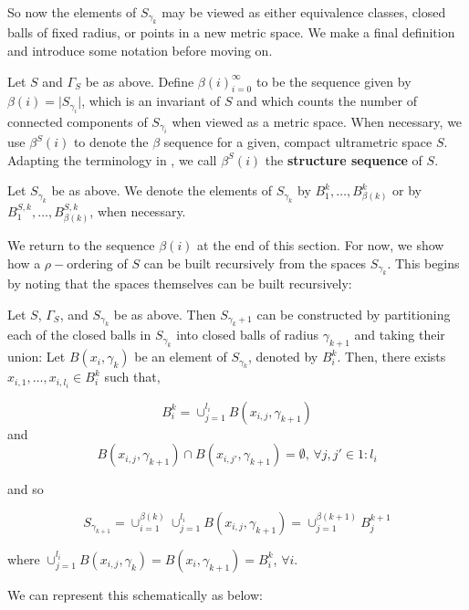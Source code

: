 So now the elements of $S_{\gamma_k}$ may be viewed as either equivalence classes, closed balls of fixed radius, or points in a new metric space. We  make a final definition and introduce some notation before moving on.

\begin{definition*}
Let $S$ and $\Gamma_S$ be as above. Define $\beta(i)_{i=0}^{\infty}$ to be the sequence given by $\beta(i) = \lvert  S_{\gamma_i}\rvert$, which is an invariant of $S$ and which counts the number of connected components of $S_{\gamma_i}$ when viewed as a metric space. When necessary, we use $\beta^S(i)$ to denote the $\beta$ sequence for a given, compact  ultrametric space $S$. Adapting the terminology in \cite{fp}, we call $\beta^S(i)$ the \textbf{structure sequence} of $S$.
\end{definition*}

\begin{notation*}
Let $S_{\gamma_k}$ be as above. We denote the elements of $S_{\gamma_k}$ by $B^k_1, \ldots, B^k_{\beta(k)}$ or by $B^{S,k}_1, \ldots, B^{S,k}_{\beta(k)}$, when necessary.
\end{notation*}


We return to the sequence $\beta(i)$ at the end of this section. For now, we show how a $\rho-$ordering of $S$ can be built recursively from the spaces $S_{\gamma_k}$. This begins by noting that the spaces themselves can be built recursively:

\begin{observation*}
Let $S$, $\Gamma_S$, and $S_{\gamma_k}$ be as above. Then $S_{\gamma_k+1}$ can be constructed by partitioning each of the closed balls in $S_{\gamma_k}$ into closed balls of radius $\gamma_{k+1}$ and taking their union:  Let $B(x_i, \gamma_k)$  be an element of $S_{\gamma_k}$, denoted by  $B^k_i$. Then, there exists $x_{i,1},\ldots, x_{i,l_{i}} \in B^k_i$ such that,

\[B^k_i=  \cup_{j=1}^{l_i} B(x_{i,j}, \gamma_{k+1})\] and  \[B(x_{i,j}, \gamma_{k+1}) \cap B(x_{i,j'}, \gamma_{k+1}) = \emptyset \text{, }\forall j,j' \in 1:l_i\] 

and so

\[S_{\gamma_{k+1}} =  \cup_{i=1}^{\beta(k)}   \cup_{j=1}^{l_i} B(x_{i,j}, \gamma_{k+1}) = \cup^{\beta(k+1)}_{j=1}B^{k+1}_{j}\] 


where $\cup_{j=1}^{l_i} B(x_{i,j},\gamma_{k})=B(x_i, \gamma_{k+1}) = B^k_i$, $\forall i$.
\end{observation*}

We can represent this schematically as below:

